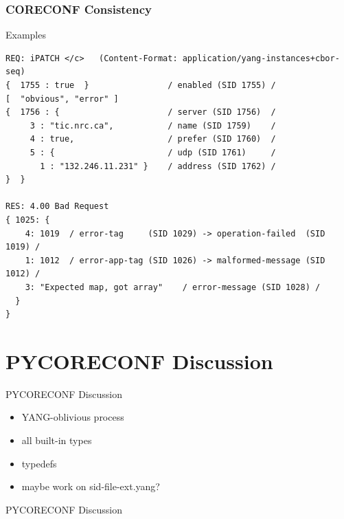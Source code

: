 \documentclass[aspectratio=169]{beamer}
\begin{document}
\begin{frame}[fragile]
  \frametitle{CORECONF Consistency}

  \begin{block}{Examples}
\footnotesize \begin{verbatim}
REQ: iPATCH </c>   (Content-Format: application/yang-instances+cbor-seq)
{  1755 : true  }                / enabled (SID 1755) /
[  "obvious", "error" ]
{  1756 : {                      / server (SID 1756)  /
     3 : "tic.nrc.ca",           / name (SID 1759)    /
     4 : true,                   / prefer (SID 1760)  /
     5 : {                       / udp (SID 1761)     /
       1 : "132.246.11.231" }    / address (SID 1762) /
}  }

RES: 4.00 Bad Request
{ 1025: {
    4: 1019  / error-tag     (SID 1029) -> operation-failed  (SID 1019) /
    1: 1012  / error-app-tag (SID 1026) -> malformed-message (SID 1012) /
    3: "Expected map, got array"    / error-message (SID 1028) /
  }
}
\end{verbatim}
  \end{block}
\end{frame}


\section{PYCORECONF Discussion}
\begin{frame}
  \begin{block}{PYCORECONF Discussion}
    \begin{itemize}
      \item YANG-oblivious process
      \item all built-in types
      \item typedefs
      \item maybe work on sid-file-ext.yang?
    \end{itemize}
  \end{block}
\end{frame}

\begin{frame}
  \begin{block}{PYCORECONF Discussion}
  \end{block}
\end{frame}
\end{document}

